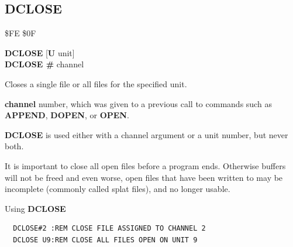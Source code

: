 \subsection{DCLOSE}
\begin{description}[leftmargin=2cm,style=nextline]
\item [Token:] \$FE \$0F
\item [Format:] {\bf DCLOSE} [{\bf U} unit] \\
		{\bf DCLOSE \#} channel
\item [Usage:]
   Closes a single file or
   all files for the specified unit.

    {\bf channel} number, which was given to a previous
    call to commands such as {\bf APPEND}, {\bf DOPEN}, or {\bf OPEN}.

   \unitdefinition

   {\bf DCLOSE} is used either with a channel argument
   or a unit number, but never both.

\item [Remarks:]
   It is important to close all open files before a program ends.
   Otherwise buffers will not be freed and even worse, open files that have been written to
   may be incomplete (commonly called splat files), and no longer usable.

\item [Examples:] Using {\bf DCLOSE}
\begin{tcolorbox}[colback=black,coltext=white]
\verbatimfont{\codefont}
\begin{verbatim}
  DCLOSE#2 :REM CLOSE FILE ASSIGNED TO CHANNEL 2
  DCLOSE U9:REM CLOSE ALL FILES OPEN ON UNIT 9
\end{verbatim}
\end{tcolorbox}
\end{description}


\newpage
